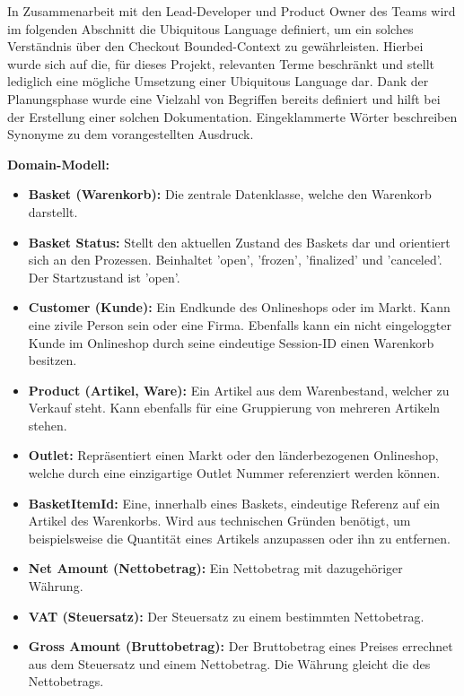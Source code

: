 In Zusammenarbeit mit den Lead-Developer und \Gls{Product Owner} des Teams wird im folgenden Abschnitt die Ubiquitous Language definiert, um ein solches Verständnis über den Checkout Bounded-Context zu gewährleisten. Hierbei wurde sich auf die, für dieses Projekt, relevanten Terme beschränkt und stellt lediglich eine mögliche Umsetzung einer Ubiquitous Language dar. Dank der Planungsphase wurde eine Vielzahl von Begriffen bereits definiert und hilft bei der Erstellung einer solchen Dokumentation. Eingeklammerte Wörter beschreiben Synonyme zu dem vorangestellten Ausdruck.

{\large \textbf{Domain-Modell:}}
\begin{itemize}[noitemsep,nolistsep]
	\item \textbf{Basket (Warenkorb): } {Die zentrale Datenklasse, welche den Warenkorb darstellt.}
	\item \textbf{Basket Status: } {Stellt den aktuellen Zustand des Baskets dar und orientiert sich an den Prozessen. Beinhaltet 'open', 'frozen', 'finalized' und 'canceled'. Der Startzustand ist 'open'.}
	\item \textbf{Customer (Kunde): } {Ein Endkunde des Onlineshops oder im Markt. Kann eine zivile Person sein oder eine Firma. Ebenfalls kann ein nicht eingeloggter Kunde im Onlineshop durch seine eindeutige Session-ID einen Warenkorb besitzen.} %
	\item \textbf{Product (Artikel, Ware): } {Ein Artikel aus dem Warenbestand, welcher zu Verkauf steht. Kann ebenfalls für eine Gruppierung von mehreren Artikeln stehen.}
	\item \textbf{Outlet: } {Repräsentiert einen Markt oder den länderbezogenen Onlineshop, welche durch eine einzigartige Outlet Nummer referenziert werden können.}
	\item \textbf{BasketItemId: } {Eine, innerhalb eines Baskets, eindeutige Referenz auf ein Artikel des Warenkorbs. Wird aus technischen Gründen benötigt, um beispielsweise die Quantität eines Artikels anzupassen oder ihn zu entfernen.}
	\item \textbf{Net Amount (Nettobetrag): } {Ein Nettobetrag mit dazugehöriger Währung.} %
	\item \textbf{VAT (Steuersatz): } {Der Steuersatz zu einem bestimmten Nettobetrag.}
	\item \textbf{Gross Amount (Bruttobetrag): } {Der Bruttobetrag eines Preises errechnet aus dem Steuersatz und einem Nettobetrag. Die Währung gleicht die des Nettobetrags.}

\end{itemize}
